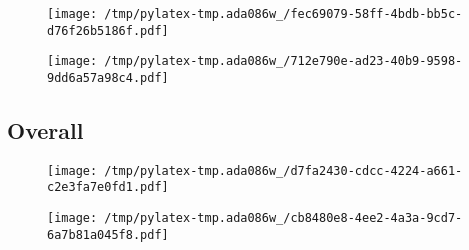 \documentclass{article}%
\begin{document}
\begin{figure}[htbp]%
\centering%
\texttt{[image: /tmp/pylatex-tmp.ada086w\_/fec69079-58ff-4bdb-bb5c-d76f26b5186f.pdf]}%
\end{figure}

%


\begin{figure}[htbp]%
\centering%
\texttt{[image: /tmp/pylatex-tmp.ada086w\_/712e790e-ad23-40b9-9598-9dd6a57a98c4.pdf]}%
\end{figure}

%
\newpage %
\subsection{Overall}%
\label{subsec:Overall}%


\begin{figure}[htbp]%
\centering%
\texttt{[image: /tmp/pylatex-tmp.ada086w\_/d7fa2430-cdcc-4224-a661-c2e3fa7e0fd1.pdf]}%
\end{figure}

%


\begin{figure}[htbp]%
\centering%
\texttt{[image: /tmp/pylatex-tmp.ada086w\_/cb8480e8-4ee2-4a3a-9cd7-6a7b81a045f8.pdf]}%
\end{figure}

%
\end{document}
